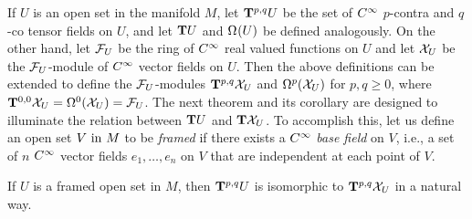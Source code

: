 \documentclass[../main]{subfiles}
\begin{document}
If $U$ is an open set in the manifold $M$, let $\tensorbundle{U}{p}{q}$ be the set of $\CInfty$ $p$-contra and $q$-co tensor fields on $U$, and let $\tangentbundle{U}$ and $\formbundle{U}{}$ be defined analogously. On the other hand, let $\realFunctions_U$ be the ring of $\CInfty$ real valued functions on $U$ and let $\vectorFields_U$ be the $\realFunctions_U$-module of $\CInfty$ vector fields on $U$. Then the above definitions can be extended to define the $\realFunctions_U$-modules $\tensorbundle{\vectorFields_U}{p}{q}$ and $\formbundle{\vectorFields_U}{p}$ for $p, q \ge 0$, where $\tensorbundle{\vectorFields_U}{0}{0} = \formbundle{\vectorFields_U}{0} = \realFunctions_U$. The next theorem and its corollary are designed to illuminate the relation between $\tangentbundle{U}$ and $\tangentbundle{\vectorFields_U}$. To accomplish this, let us define an open set $V \InText M$ to be \emph{framed} if there exists a $\CInfty$ \emph{base field} on $V$, i.e., a set of $n$ $\CInfty$ vector fields $e_1,\dots,e_n$ on $V$ that are independent at each point of $V$.



\begin{theorem} \label{thm:ch4.1}
If $U$ is a framed open set in $M$, then $\tensorbundle{U}{p}{q}$ is isomorphic to $\tensorbundle{\vectorFields_U}{p}{q}$ in a natural way.
\end{theorem}
\end{document}
